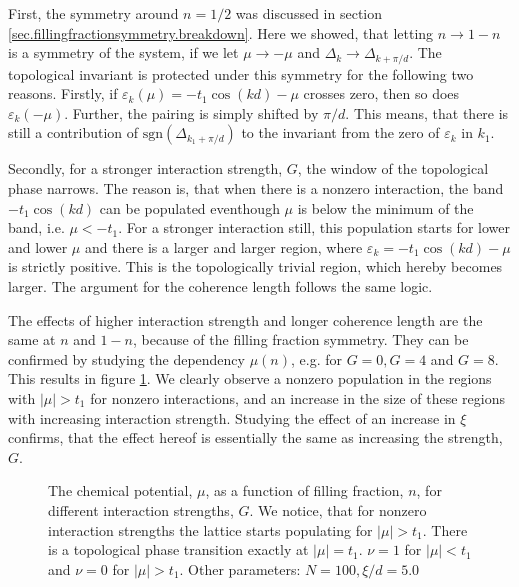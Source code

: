 First, the symmetry around $n = 1/2$ was discussed in section \ref{sec.fillingfractionsymmetry.breakdown}. Here we showed, that letting $n\to 1 - n$ is a symmetry of the system, if we let $\mu \to -\mu$ and $\Delta_{k} \to \Delta_{k + \pi/d}$. The topological invariant is protected under this symmetry for the following two reasons. Firstly, if $\varepsilon_k(\mu) = -t_1\cos(kd) - \mu$ crosses zero, then so does $\varepsilon_k(-\mu)$. Further, the pairing is simply shifted by $\pi / d$. This means, that there is still a contribution of $\text{sgn}(\Delta_{k_1+\pi/d})$ to the invariant from the zero of $\varepsilon_k$ in $k_1$.

Secondly, for a stronger interaction strength, $G$, the window of the topological phase narrows. The reason is, that when there is a nonzero interaction, the band $-t_1\cos(kd)$ can be populated eventhough $\mu$ is below the minimum of the band, i.e. $\mu < -t_1$. For a stronger interaction still, this population starts for lower and lower $\mu$ and there is a larger and larger region, where $\varepsilon_k = -t_1\cos(kd) - \mu$ is strictly positive. This is the topologically trivial region, which hereby becomes larger. The argument for the coherence length follows the same logic.

The effects of higher interaction strength and longer coherence length are the same at $n$ and $1 - n$, because of the filling fraction symmetry. They can be confirmed by studying the dependency $\mu(n)$, e.g. for $G = 0, G = 4$ and $G = 8$. This results in figure \ref{fig.mun.t20.Gdepend}. We clearly observe a nonzero population in the regions with $|\mu| > t_1$ for nonzero interactions, and an increase in the size of these regions with increasing interaction strength. Studying the effect of an increase in $\xi$ confirms, that the effect hereof is essentially the same as increasing the strength, $G$.  

\begin{figure}
\begin{center}

\caption{The chemical potential, $\mu$, as a function of filling fraction, $n$, for different interaction strengths, $G$. We notice, that for nonzero interaction strengths the lattice starts populating for $|\mu| > t_1$. There is a topological phase transition exactly at $|\mu| = t_1$. $\nu = 1$ for $|\mu|< t_1$ and $\nu = 0$ for $|\mu| > t_1$. Other parameters: $N = 100, \xi / d = 5.0$}
\label{fig.mun.t20.Gdepend}
\end{center}
\end{figure}

